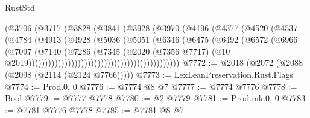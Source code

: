 \begin{lexlean}{RustStd}
\begin{coremodule}
{\begin{coremodule}
{{{{{{{{{{{{{{{{{{{{{{{{{{{{{{{{{{{{{                                            (@3706
                                              (@3717
                                                (@3828
                                                  (@3841
                                                    (@3928
                                                      (@3970
                                                        (@4196
                                                          (@4377
                                                            (@4520
                                                              (@4537
                                                                (@4784
                                                                  (@4913
                                                                    (@4928
                                                                      (@5036
                                                                        (@5051
                                                                          (@6346
                                                                            (@6475
                                                                              (@6492
                                                                                (@6572
                                                                                  (@6966
                                                                                    (@7097
                                                                                      (@7140
                                                                                        (@7286
                                                                                          (@7345
                                                                                            (@2020
                                                                                              (@7356
                                                                                                @7717)
                                                                                              (@10
                                                                                                @2019))))))))))))))))))))))))))))))))))))))))))))))
@7772 := @2018 (@2072 (@2088 (@2098 (@2114 (@2124 @7766)))))
@7773 := LexLeanPreservation.Rust.Flags
@7774 := Prod.{0, 0}
@7776 := @7774 @8 @7
@7777 := @7774 @7776
@7778 := Bool
@7779 := @7777 @7778
@7780 := @2 @7779
@7781 := Prod.mk.{0, 0}
@7783 := @7781 @7776 @7778
@7785 := @7781 @8 @7
}}}}}}}}}}}}}}}}}}}}}}}}}}}}}}}}}}}}}
\end{coremodule}}
\end{coremodule}
\end{lexlean}
